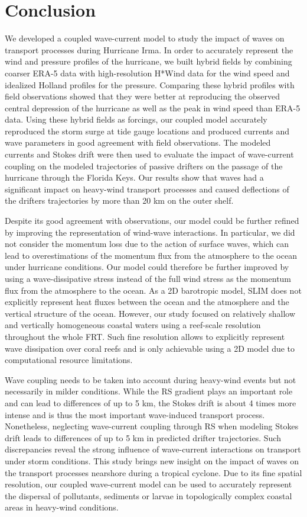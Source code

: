 \section{Conclusion}

We developed a coupled wave-current model to study the impact of waves on transport processes during Hurricane Irma. In order to accurately represent the wind and pressure profiles of the hurricane, we built hybrid fields by combining coarser ERA-5 data with high-resolution H*Wind data for the wind speed and idealized Holland profiles for the pressure. Comparing these hybrid profiles with field observations showed that they were better at reproducing the observed central depression of the hurricane as well as the peak in wind speed than ERA-5 data. Using these hybrid fields as forcings, our coupled model accurately reproduced the storm surge at tide gauge locations and produced currents and wave parameters in good agreement with field observations. The modeled currents and Stokes drift were then used to evaluate the impact of wave-current coupling on the modeled trajectories of passive drifters on the passage of the hurricane through the Florida Keys. Our results show that waves had a significant impact on heavy-wind transport processes and caused deflections of the drifters trajectories by more than 20 km on the outer shelf.

Despite its good agreement with observations, our model could be further refined by improving the representation of wind-wave interactions. In particular, we did not consider the momentum loss due to the action of surface waves, which can lead to overestimations of the momentum flux from the atmosphere to the ocean under hurricane conditions. Our model could therefore be further improved by using a wave-dissipative stress instead of the full wind stress as the momentum flux from the atmosphere to the ocean. As a 2D barotropic model, SLIM does not explicitly represent heat fluxes between the ocean and the atmosphere and the vertical structure of the ocean. However, our study focused on relatively shallow and vertically homogeneous coastal waters using a reef-scale resolution throughout the whole FRT. Such fine resolution allows to explicitly represent wave dissipation over coral reefs and is only achievable using a 2D model due to computational resource limitations.

Wave coupling needs to be taken into account during heavy-wind events but not necessarily in milder conditions. While the RS gradient plays an important role and can lead to differences of up to 5 km, the Stokes drift is about 4 times more intense and is thus the most important wave-induced transport process. Nonetheless, neglecting wave-current coupling through RS when modeling Stokes drift leads to differences of up to 5 km in predicted drifter trajectories. Such discrepancies reveal the strong influence of wave-current interactions on transport under storm conditions. This study brings new insight on the impact of waves on the transport processes nearshore during a tropical cyclone. Due to its fine spatial resolution, our coupled wave-current model can be used to accurately represent the dispersal of pollutants, sediments or larvae in topologically complex coastal areas in heavy-wind conditions.  
